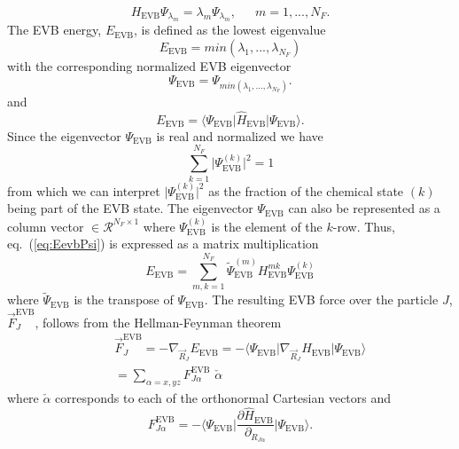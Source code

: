 \begin{equation}\label{eq:Heig}
 H_{\text{EVB}}\Psi_{\lambda_m}=\lambda_m \Psi_{\lambda_m}, \,\,\,\,\,\,\,\,\, m=1,...,N_F.
\end{equation}
The EVB energy, $E_{\text{EVB}}$, is defined as the lowest eigenvalue
\begin{equation}\label{eq:Eevb}
 E_{\text{EVB}}=min(\lambda_1,...,\lambda_{N_F})
\end{equation}
with the corresponding normalized EVB eigenvector
\begin{equation}\label{eq:Psi-evb-norm}
 \Psi_{\text{EVB}}=\Psi_{min(\lambda_1,...,\lambda_{N_F})}.
\end{equation}
and
\begin{equation}\label{eq:EevbPsi}
 E_{\text{EVB}}=\big\langle \Psi_{\text{EVB}}\big|\hat{H}_{\text{EVB}}\big| \Psi_{\text{EVB}}\big \rangle.
\end{equation}
Since the eigenvector $\Psi_{\text{EVB}}$ is real and normalized we have
\begin{equation}\label{eq:evbPsinorm}
\sum_{k=1}^{N_F} \big|\Psi^{(k)}_{\text{EVB}}\big|^{2}=1
\end{equation}
from which we can interpret $|\Psi^{(k)}_{\text{EVB}}\big|^{2}$ as the fraction of the chemical state $(k)$ being part of the EVB state. The eigenvector $\Psi_{\text{EVB}}$ can also be represented as a column vector $\in \mathcal{R}^{N_F \times 1}$ where  $\Psi^{(k)}_{\text{EVB}}$ is the element of the $k$-row. Thus, eq.~(\ref{eq:EevbPsi}) is expressed as a matrix multiplication
\begin{equation}\label{eq:EevbPsimat}
E_{\text{EVB}}=\sum_{m,k=1}^{N_F} \tilde{\Psi}^{(m)}_{\text{EVB}} H^{mk}_{\text{EVB}}\Psi^{(k)}_{\text{EVB}}
\end{equation}
where $\tilde{\Psi}_{\text{EVB}}$ is the transpose of ${\Psi}_{\text{EVB}}$. The resulting EVB force over the particle $J$,  $\vec{F}_{J}^{\text{EVB}}$, follows from the Hellman-Feynman theorem
\begin{eqnarray}\label{eq:Fevb}
&&\vec{F}_{J}^{\text{EVB}}=-\nabla_{\vec{R}_J}E_{\text{EVB}}=-\big\langle \Psi_{\text{EVB}}\big| \nabla_{\vec{R}_J} \hat{H}_{\text{EVB}} \big| \Psi_{\text{EVB}}\big \rangle \nonumber \\
&&= \sum_{\alpha=x,yz} F_{J\alpha}^{\text{EVB}} \,\, \check{\alpha}
\end{eqnarray}
where $\check{\alpha}$ corresponds to each of the orthonormal Cartesian vectors and 
\begin{equation}\label{eq:Fevb2}
F_{J\alpha}^{\text{EVB}}=-\big\langle \Psi_{\text{EVB}}\big| \frac{\partial \hat{H}_{\text{EVB}}}{\partial_{R_{J\alpha}}}\big| \Psi_{\text{EVB}}\big \rangle.
\end{equation}
